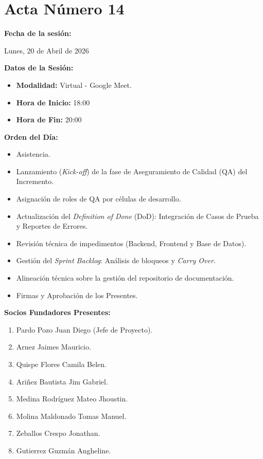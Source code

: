 \newpage
\section{Acta Número 14}
\label{sec:acta14}

\noindent \textbf{Fecha de la sesión:}\par
Lunes, 20 de Abril de 2026

\vspace*{0.5cm}
\noindent \textbf{Datos de la Sesión:}
\vspace{-0.2cm}
\begin{itemize}[noitemsep]
    \item \textbf{Modalidad:} Virtual - Google Meet.
    \item \textbf{Hora de Inicio:} 18:00
    \item \textbf{Hora de Fin:} 20:00
\end{itemize}

\vspace*{0.5cm}
\noindent \textbf{Orden del Día:}
\vspace{-0.2cm}
\begin{itemize}[noitemsep]
    \item Asistencia.
    \item Lanzamiento (\textit{Kick-off}) de la fase de Aseguramiento de Calidad (QA) del Incremento.
    \item Asignación de roles de QA por células de desarrollo.
    \item Actualización del \textit{Definition of Done} (DoD): Integración de Casos de Prueba y Reportes de Errores.
    \item Revisión técnica de impedimentos (Backend, Frontend y Base de Datos).
    \item Gestión del \textit{Sprint Backlog}: Análisis de bloqueos y \textit{Carry Over}.
    \item Alineación técnica sobre la gestión del repositorio de documentación.
    \item Firmas y Aprobación de los Presentes.
\end{itemize}

\vspace*{0.5cm}
\noindent \textbf{Socios Fundadores Presentes:}
\vspace{-0.2cm}
\begin{enumerate}[noitemsep]
    \item Pardo Pozo Juan Diego (Jefe de Proyecto).
    \item Arnez Jaimes Mauricio.
    \item Quispe Flores Camila Belen.
    \item Ariñez Bautista Jim Gabriel.
    \item Medina Rodríguez Mateo Jhoustin.
    \item Molina Maldonado Tomas Manuel.
    \item Zeballos Crespo Jonathan.
    \item Gutierrez Guzmán Angheline.
\end{enumerate}

